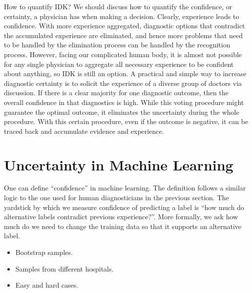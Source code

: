\documentclass[11pt]{pnas-new}
\begin{document}
How to quantify IDK? We should discuss how to quantify the confidence, or certainty, a physician has when making a decision. 
Clearly, experience leads to confidence. With more experience aggregated, diagnostic options that contradict the accumulated
  experience are eliminated, and hence more problems that need to be handled by the elimination process can be handled by the recognition process. However, facing our complicated human body, it is almost not possible for any single physician to aggregate all necessary experience to be confident about anything, so IDK is still an option. A practical and simple way to increase diagnostic certainty is to solicit the experience of a diverse group of doctors via discussion. If there is a clear majority for one diagnostic outcome,
      then the overall confidence in that diagnostics is high. While this voting procedure might guarantee the optimal outcome, it eliminates the uncertainty during the whole procedure. With this certain procedure, even if the outcome is negative, it can be traced back and accumulate evidence and experience. 

\section{Uncertainty in Machine Learning}

One can define ``confidence'' in machine learning. The definition follows a
similar logic to the one used for human diagnosticians in the previous
section. The yardstick by which we measure confidence of predicting a
label is ``how much do alternative labels contradict previous
experience?''.
More formally, we ask how much do we need to change the training data
so that it supports an alternative label.

\begin{itemize}
  \item Bootstrap samples.
  \item Samples from different hospitals.
  \item Easy and hard cases.
  \end{itemize}
\end{document}

